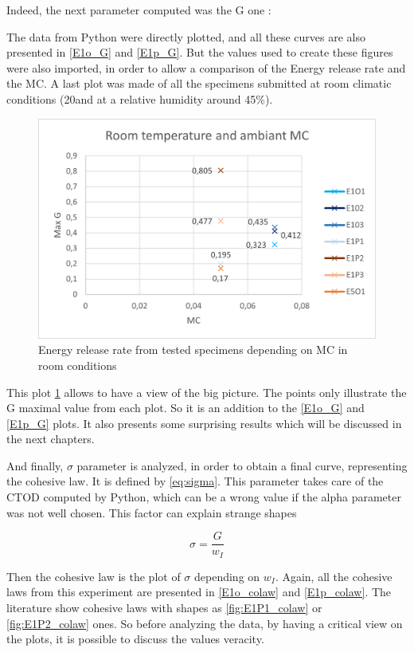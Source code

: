 Indeed, the next parameter computed was the G one :

The data from Python were directly plotted, and all these curves are also presented in \ref{E1o_G} and \ref{E1p_G}. But the values used to create these figures were also imported, in order to allow a comparison of the Energy release rate and the MC. A last plot was made of all the specimens submitted at room climatic conditions (20\textcelsius and at a relative humidity around 45\%).
\begin{figure}[th]
	\centering
	\includegraphics[width=\textwidth]{Figures/Res_MCamb}
	\caption[G depending on MC in room conditions]{Energy release rate from tested specimens depending on MC in room conditions}
	\label{fig:Res_MCamb}
\end{figure}

This plot \ref{fig:Res_MCamb} allows to have a view of the big picture. The points only illustrate the G maximal value from each plot. So it is an addition to the \ref{E1o_G} and \ref{E1p_G} plots. It also presents some surprising results which will be discussed in the next chapters.

And finally, $\sigma$ parameter is analyzed, in order to obtain a final curve, representing the cohesive law. It is defined by \ref{eq:sigma}. This parameter takes care of the CTOD computed by Python, which can be a wrong value if the alpha parameter was not well chosen. This factor can explain strange shapes

\begin{equation}
\sigma = \frac{G}{w_{I}}
\label{eq:sigma}
\end{equation} 

Then the cohesive law is the plot of $\sigma$ depending on $w_{I}$. Again, all the cohesive laws from this experiment are presented in \ref{E1o_colaw} and \ref{E1p_colaw}. The literature show cohesive laws with shapes as \ref{fig:E1P1_colaw} or \ref{fig:E1P2_colaw} ones. So before analyzing the data, by having a critical view on the plots, it is possible to discuss the values veracity.

